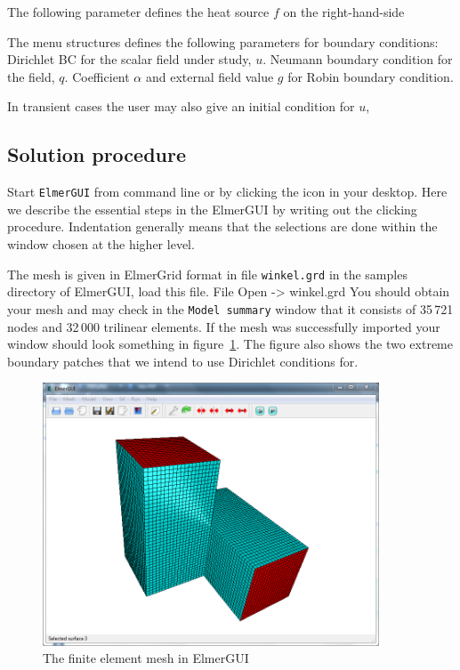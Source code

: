 \noindent
The following parameter defines the heat source $f$ on the right-hand-side
\sifbegin
{}
\sifend

\noindent
The menu structures defines the following parameters for boundary conditions:
\sifbegin
{}
Dirichlet BC for the scalar field under study, $u$.
Neumann boundary condition for the field, $q$.
Coefficient $\alpha$ and external field value $g$ for Robin boundary condition.
\sifend

\noindent
In transient cases the user may also give an initial condition for $u$, 
\sifbegin
{}
\sifend


\subsection*{Solution procedure}

Start \texttt{ElmerGUI} from command line or by clicking the icon in your desktop. Here we describe 
the essential steps in the ElmerGUI by writing out the clicking procedure. Indentation generally means 
that the selections are done within the window chosen at the higher level. 

The mesh is given in ElmerGrid format in file \texttt{winkel.grd} in the samples directory of ElmerGUI, 
load this file.
\ttbegin
File 
  Open -> winkel.grd
\ttend
You should obtain your mesh and may check in the \texttt{Model summary} 
window that it consists of 35\,721 nodes and 32\,000 trilinear elements.
If the mesh was successfully imported your window should look something in figure~\ref{fg:modelpde1}.
The figure also shows the two extreme boundary patches that we intend to use Dirichlet conditions
for. 
\begin{figure}
\begin{center}
\includegraphics[width=100mm]{ModelPDE_Mesh.PNG}
\caption{The finite element mesh in ElmerGUI}\label{fg:modelpde1}
\end{center}
\end{figure}

